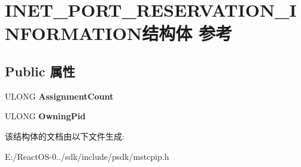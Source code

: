 \hypertarget{struct_i_n_e_t___p_o_r_t___r_e_s_e_r_v_a_t_i_o_n___i_n_f_o_r_m_a_t_i_o_n}{}\section{I\+N\+E\+T\+\_\+\+P\+O\+R\+T\+\_\+\+R\+E\+S\+E\+R\+V\+A\+T\+I\+O\+N\+\_\+\+I\+N\+F\+O\+R\+M\+A\+T\+I\+O\+N结构体 参考}
\label{struct_i_n_e_t___p_o_r_t___r_e_s_e_r_v_a_t_i_o_n___i_n_f_o_r_m_a_t_i_o_n}
\subsection*{Public 属性}
\begin{DoxyCompactItemize}
\item 
\mbox{\label{struct_i_n_e_t___p_o_r_t___r_e_s_e_r_v_a_t_i_o_n___i_n_f_o_r_m_a_t_i_o_n_a12fccb842fac36031ddd2b7f76bfb2ce}} 
U\+L\+O\+NG {\bfseries Assignment\+Count}
\item 
\mbox{\label{struct_i_n_e_t___p_o_r_t___r_e_s_e_r_v_a_t_i_o_n___i_n_f_o_r_m_a_t_i_o_n_a3ff190a4084474cba4ab4da9bdec5d3a}} 
U\+L\+O\+NG {\bfseries Owning\+Pid}
\end{DoxyCompactItemize}


该结构体的文档由以下文件生成\+:\begin{DoxyCompactItemize}
\item 
E\+:/\+React\+O\+S-\/0../sdk/include/psdk/mstcpip.\+h\end{DoxyCompactItemize}
